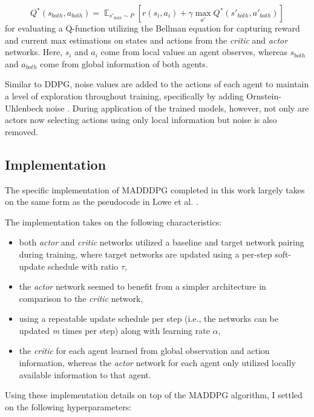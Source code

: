 \documentclass[11pt]{article}
\begin{document}
	\begin{equation}
		Q^*(s_{both}, a_{both}) = \mathop{\mathbb{E}}_{s'_{both} \sim P}\left[r(s_i, a_i) + \gamma\mathop{\mathbb{\text{max}}}_{a'}Q^*(s'_{both}, a'_{both})\right]
	\end{equation}
	for evaluating a Q-function utilizing the Bellman equation for capturing reward and current max estimations on states and actions from the \textit{critic} and \textit{actor} networks. Here, $s_i$ and $a_i$ come from local values an agent observes, whereas $s_{both}$ and $a_{both}$ come from global information of both agents.
	
	Similar to DDPG, noise values are added to the actions of each agent to maintain a level of exploration throughout training, specifically by adding Ornstein-Uhlenbeck noise \cite{ddpg}. During application of the trained models, however, not only are actors now selecting actions using only local information but noise is also removed.
	
	\subsection{Implementation}
	
	The specific implementation of MADDDPG completed in this work largely takes on the same form as the pseudocode in Lowe et al. \cite{maddpg}.
	
	The implementation takes on the following characteristics:
	\begin{itemize}
		\item both \textit{actor} and \textit{critic} networks utilized a baseline and target network pairing during training, where target networks are updated using a per-step soft-update schedule with ratio $\tau$,
		\item the \textit{actor} network seemed to benefit from a simpler architecture in comparison to the \textit{critic} network,
		\item using a repeatable update schedule per step (i.e., the networks can be updated \textit{m} times per step) along with learning rate $\alpha$,
		\item the \textit{critic} for each agent learned from global observation and action information, whereas the \textit{actor} network for each agent only utilized locally available information to that agent.
	\end{itemize}
	
	\FloatBarrier
	
	Using these implementation details on top of the MADDPG algorithm, I settled on the following hyperparameters:
	
\end{document}
